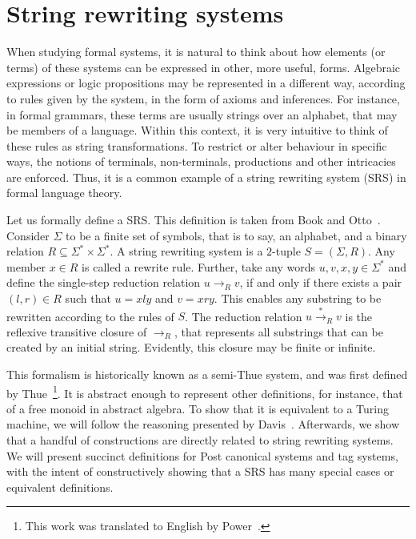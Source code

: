\documentclass[12pt]{article}
\begin{document}
\section{String rewriting systems}\label{sec:srs}

When studying formal systems, it is natural to think about how elements (or
terms) of these systems can be expressed in other, more useful, forms.
Algebraic expressions or logic propositions may be represented in a different
way, according to rules given by the system, in the form of axioms and
inferences. For instance, in formal grammars, these terms are usually strings
over an alphabet, that may be members of a language. Within this context, it is
very intuitive to think of these rules as string transformations. To restrict
or alter behaviour in specific ways, the notions of terminals, non-terminals,
productions and other intricacies are enforced. Thus, it is a common example of
a string rewriting system (SRS) in formal language theory.

Let us formally define a SRS. This definition is taken from Book and
Otto~\cite[Sec. 2.1]{Book:book:1993}. Consider $\Sigma$ to be a finite set of
symbols, that is to say, an alphabet, and a binary relation $R \subseteq
\Sigma^{*} \times \Sigma^{*}$. A string rewriting system is a $2$-tuple $S =
(\Sigma, R)$. Any member $x \in R$ is called a rewrite rule. Further, take any
words $u, v, x, y \in \Sigma^{*}$ and define the single-step reduction relation
$u \rightarrow_{R} v$, if and only if there exists a pair $(l, r) \in R$ such
that $u = xly$ and $v = xry$. This enables any substring to be rewritten
according to the rules of $S$. The reduction relation $u
\stackrel{*}{\rightarrow}_{R} v$ is the reflexive transitive closure of
$\rightarrow_{R}$, that represents all substrings that can be created by an
initial string. Evidently, this closure may be finite or infinite.

This formalism is historically known as a semi-Thue system, and was first
defined by Thue~\cite{Thue:article:1914:may}\footnote{This work was translated
to English by Power~\cite{Power:misc:2013:aug}.}. It is abstract enough to
represent other definitions, for instance, that of a free monoid in abstract
algebra. To show that it is equivalent to a Turing machine, we will follow the
reasoning presented by Davis~\cite{Davis:book:1958}. Afterwards, we show that a
handful of constructions are directly related to string rewriting systems. We
will present succinct definitions for Post canonical systems and tag systems,
with the intent of constructively showing that a SRS has many special cases or
equivalent definitions.
\end{document}

